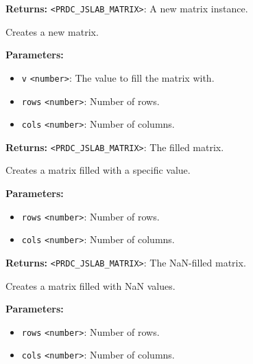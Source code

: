 \documentclass[12pt,a4paper]{article}
\begin{document}
\noindent \textbf{Returns:} \texttt{<PRDC\_JSLAB\_MATRIX>}: A new matrix instance.

\noindent Creates a new matrix.

\vspace{5mm}
\noindent {}


\noindent \textbf{Parameters:}
\begin{itemize}
  \item \texttt{v} \texttt{<number>}: The value to fill the matrix with.
  \item \texttt{rows} \texttt{<number>}: Number of rows.
  \item \texttt{cols} \texttt{<number>}: Number of columns.
\end{itemize}

\noindent \textbf{Returns:} \texttt{<PRDC\_JSLAB\_MATRIX>}: The filled matrix.

\noindent Creates a matrix filled with a specific value.

\vspace{5mm}
\noindent {}


\noindent \textbf{Parameters:}
\begin{itemize}
  \item \texttt{rows} \texttt{<number>}: Number of rows.
  \item \texttt{cols} \texttt{<number>}: Number of columns.
\end{itemize}

\noindent \textbf{Returns:} \texttt{<PRDC\_JSLAB\_MATRIX>}: The NaN-filled matrix.

\noindent Creates a matrix filled with NaN values.

\vspace{5mm}
\noindent {}


\noindent \textbf{Parameters:}
\begin{itemize}
  \item \texttt{rows} \texttt{<number>}: Number of rows.
  \item \texttt{cols} \texttt{<number>}: Number of columns.
\end{itemize}
\end{document}
